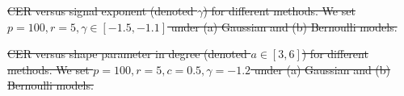 \documentclass[twoside]{article}
\theoremstyle{definition}
\theoremstyle{definition}
\providecommand{\DIFdeltex}[1]{{\protect\color{red}\sout{#1}}}                      %
\providecommand{\DIFdelbegin}{} %
\providecommand{\DIFdelFL}[1]{\DIFdel{#1}} %
\providecommand{\DIFdel}[1]{\texorpdfstring{\DIFdeltex{#1}}{}} %
\newcommand{\DIFscaledelfig}{0.5}
\newlength{\DIFdelgraphicswidth} %
\newlength{\DIFdelgraphicsheight} %
\newcommand{\DIFdelincludegraphics}[2][]{%
\sbox{\DIFdelgraphicsbox}{\DIFOincludegraphics[#1]{#2}}%
\settoboxwidth{\DIFdelgraphicswidth}{\DIFdelgraphicsbox} %
\settoboxtotalheight{\DIFdelgraphicsheight}{\DIFdelgraphicsbox} %
\scalebox{\DIFscaledelfig}{%
\parbox[b]{\DIFdelgraphicswidth}{\usebox{\DIFdelgraphicsbox}\\[-\baselineskip] \rule{\DIFdelgraphicswidth}{0em}}\llap{\resizebox{\DIFdelgraphicswidth}{\DIFdelgraphicsheight}{%
\setlength{\unitlength}{\DIFdelgraphicswidth}%
\begin{picture}(1,1)%
\thicklines\linethickness{2pt} %
{\color[rgb]{1,0,0}\put(0,0){\framebox(1,1){}}}%
{\color[rgb]{1,0,0}\put(0,0){\line( 1,1){1}}}%
{\color[rgb]{1,0,0}\put(0,1){\line(1,-1){1}}}%
\end{picture}%
}\hspace*{3pt}}} %
} %
\DeclareRobustCommand{\DIFdelbegin}{\DIFOdelbegin \let\includegraphics\DIFdelincludegraphics} %
\begin{document}

\DIFdelbegin %
{%
\DIFdelFL{CER versus signal exponent (denoted $\gamma$) for different methods. We set $p = 100, r = 5, \gamma \in [-1.5, -1.1]$ under (a) Gaussian and (b) Bernoulli models.}}

{%
\DIFdelFL{CER versus shape parameter in degree (denoted $a\in[3,6]$) for different methods. We set $p = 100, r = 5, c= 0.5, \gamma = -1.2$ under (a) Gaussian and (b) Bernoulli models.}}
\end{document}

